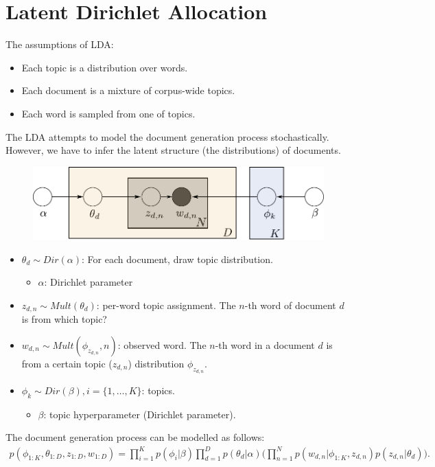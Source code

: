 \section{Latent Dirichlet Allocation}
\label{sec:topic_modeling_lda}


The assumptions of LDA:
\begin{itemize}
	\item Each topic is a distribution over words.
	\item Each document is a mixture of corpus-wide topics.
	\item Each word is sampled from one of topics. 
\end{itemize}
The LDA attempts to model the document generation process stochastically. However, we have to infer the latent structure (the distributions) of documents. 

\begin{figure}[h]
	\centering
	\includegraphics[scale=1.0]{./images/lda/lda.pdf}
\end{figure}
\begin{itemize}
	\item $\theta_d\sim Dir(\alpha)$: For each document, draw topic distribution. 
		\begin{itemize}
			\item $\alpha$: Dirichlet parameter
		\end{itemize}
	\item $z_{d,n}\sim Mult(\theta_d)$: per-word topic assignment. The $n$-th word of document $d$ is from which topic?
	\item $w_{d,n}\sim Mult(\phi_{z_{d,n}},n)$: observed word. The $n$-th word in a document $d$ is from a certain topic ($z_{d,n}$) distribution $\phi_{z_{d,n}}$.
	\item $\phi_k\sim Dir(\beta), i=\{1,\dots,K\}$: topics.
		\begin{itemize}
			\item $\beta$: topic hyperparameter (Dirichlet parameter).
		\end{itemize}
\end{itemize}
The document generation process can be modelled as follows:
\begin{align*}
	p(\phi_{1:K}, \theta_{1:D}, z_{1:D}, w_{1:D}) = \prod_{i=1}^K p(\phi_i|\beta)\prod_{d=1}^D p(\theta_d|\alpha)\bigg(\prod_{n=1}^N p(w_{d,n}|\phi_{1:K},z_{d,n})p(z_{d,n}|\theta_d)\bigg).
\end{align*}

